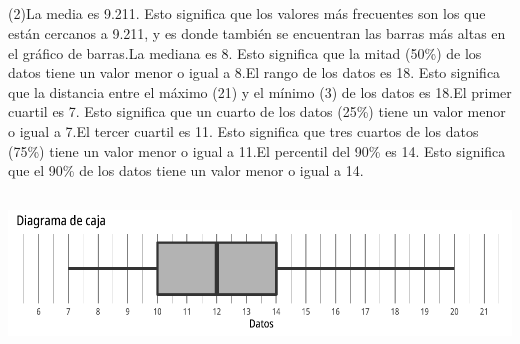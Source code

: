 \documentclass{cdplf-prueba}
\begin{document}
\subsection{}
\begin{tasks}[label={\tcbox[colback=black!60, colframe=black!60, coltext=white, on line, boxsep=0pt, left=3pt, right=3pt, top=2pt, bottom=2pt]{\sffamily\bfseries\alph*}},
item-indent=1.2cm,column-sep=20pt,label-offset=0.3cm,label-width=15pt,after-item-skip=10pt,item-format=\raggedright](2)\task La media es 9.211.
 Esto significa que los valores más frecuentes son los que están cercanos a 9.211, y es donde también se encuentran las barras más altas 
 en el gráfico de barras.\task La mediana es 8. 
 Esto significa que la mitad (50\%) de los datos tiene un valor menor 
 o igual a 8.\task El rango de los datos es 18. Esto 
 significa que la distancia entre el máximo (21) y el mínimo (3) de los datos es 18.\task El primer cuartil es 7. Esto significa que un cuarto de los datos (25\%) tiene un valor 
 menor o igual a 7.\task El tercer cuartil es 11. Esto significa que tres cuartos de los datos (75\%) tiene un valor menor
 o igual a 11.\task El percentil del 90\% es 14. Esto significa que el 90\% de los datos tiene un valor menor o igual a 14.\end{tasks}
\subsection{}
\begin{center}\includegraphics{diagrama_caja_2.pdf}\end{center}
\end{document}
